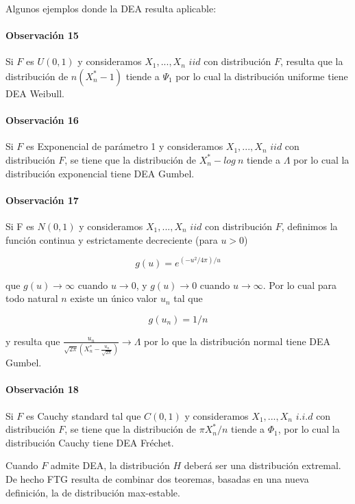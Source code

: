 \documentclass[
  12pt]{article}
\begin{document}
Algunos ejemplos donde la DEA resulta aplicable:

\paragraph*{Observación 15}

Si \(F\) es \(U(0,1)\) y consideramos \(X_1,...,X_n\) \(iid\) con
distribución \(F\), resulta que la distribución de \(n( X_n^*- 1)\)
tiende a \(\Psi_1\) por lo cual la distribución uniforme tiene DEA
Weibull.

\paragraph*{Observación 16}

Si \(F\) es Exponencial de parámetro 1 y consideramos \(X_1,...,X_n\)
\(iid\) con distribución \(F\), se tiene que la distribución de
\(X_n^*- log\: n\) tiende a \(\Lambda\) por lo cual la distribución
exponencial tiene DEA Gumbel.

\paragraph*{Observación 17}

Si F es \(N(0,1)\) y consideramos \(X_1,...,X_n\) \(iid\) con
distribución \(F\), definimos la función continua y estrictamente
decreciente (para \(u>0\))

\[
g(u)=e^{(-u^2/4\pi)/u}
\]

que \(g(u)\rightarrow \infty\) cuando \(u\rightarrow 0\), y
\(g(u)\rightarrow 0\) cuando \(u\rightarrow \infty\). Por lo cual para
todo natural \(n\) existe un único valor \(u_n\) tal que

\[
g(u_n)=1/n
\]

y resulta que
\(\frac{u_n}{\sqrt{2\pi}\left (X_n^*-\frac{u_n}{\sqrt{2\pi}}\right )}\longrightarrow \Lambda\)
por lo que la distribución normal tiene DEA Gumbel.

\paragraph*{Observación 18}

Si \(F\) es Cauchy standard tal que \(C(0,1)\) y consideramos
\(X_1,...,X_n\) \(i.i.d\) con distribución \(F\), se tiene que la
distribución de \(\pi X^*_n/n\) tiende a \(\Phi_1\), por lo cual la
distribución Cauchy tiene DEA Fréchet.

Cuando \(F\) admite DEA, la distribución \(H\) deberá ser una
distribución extremal. De hecho FTG resulta de combinar dos teoremas,
basadas en una nueva definición, la de distribución max-estable.
\end{document}
